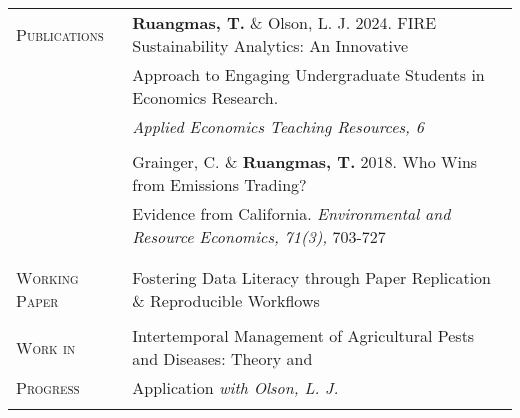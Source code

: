 \documentclass[letterpaper,11pt,oneside]{article}\usepackage[]{graphicx}\usepackage[]{xcolor}
\begin{document}
\noindent \begin{tabular}{p{1.2in} l}
\textsc{Publications}   & \textbf{Ruangmas, T.} \& Olson, L. J. 2024. FIRE Sustainability Analytics: An Innovative \\
				                & Approach to Engaging Undergraduate Students in Economics Research. \\
				                & \textit{Applied Economics Teaching Resources, 6} \href{https://www.aetrjournal.org/advance-access/special-issue-on-undergraduate-research-in-agricultural-and-applied-economics/fire-sustainability-analytics-an-innovative-approach-to-engaging-undergraduate-students-in-economics-research}{\color{blue}{[LINK]}} \\
	                      & \\  
                        & Grainger, C. \& \textbf{Ruangmas, T.} 2018. Who Wins from Emissions Trading? \\
				                & Evidence from California. \textit{Environmental and Resource Economics, 71(3),} 703-727 \\
				                & \href{https://doi.org/10.1007/s10640-017-0180-1}{\color{blue}{[LINK]}} \\
				                & \\   
\textsc{Working Paper} & Fostering Data Literacy through Paper Replication \& Reproducible Workflows  \href{https://github.com/ruangmas/ruangmas.github.io/blob/main/WorkingPaper.pdf}{\color{blue}{[LINK]}}\\				                
			            	& \\
\textsc{Work in}	& Intertemporal Management of Agricultural Pests and Diseases: Theory and \\			
\textsc{Progress} & Application \textit{with Olson, L. J.}\\
                  & \\
                 

\end{tabular}
\end{document}
